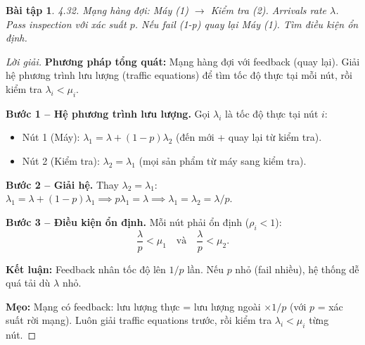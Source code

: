 \documentclass[8pt,a4paper]{article}
\newtheorem{exercise}{Bài tập}
\newenvironment{solution}{\begin{proof}[Lời giải]}{\end{proof}}
\begin{document}
\begin{exercise}
4.32. Mạng hàng đợi: Máy (1) $\to$ Kiểm tra (2). Arrivals rate $\lambda$. Pass inspection với xác suất $p$. Nếu fail (1-p) quay lại Máy (1). Tìm điều kiện ổn định.
\end{exercise}
\begin{solution}
\textbf{Phương pháp tổng quát:} Mạng hàng đợi với feedback (quay lại). Giải hệ phương trình lưu lượng (traffic equations) để tìm tốc độ thực tại mỗi nút, rồi kiểm tra $\lambda_i < \mu_i$.

\textbf{Bước 1 -- Hệ phương trình lưu lượng.} Gọi $\lambda_i$ là tốc độ thực tại nút $i$:
\begin{itemize}[nosep]
\item Nút 1 (Máy): $\lambda_1 = \lambda + (1-p)\lambda_2$ \quad (đến mới + quay lại từ kiểm tra).
\item Nút 2 (Kiểm tra): $\lambda_2 = \lambda_1$ \quad (mọi sản phẩm từ máy sang kiểm tra).
\end{itemize}

\textbf{Bước 2 -- Giải hệ.} Thay $\lambda_2 = \lambda_1$:
$\lambda_1 = \lambda + (1-p)\lambda_1 \implies p\lambda_1 = \lambda \implies \boxed{\lambda_1 = \lambda_2 = \lambda/p}$.

\textbf{Bước 3 -- Điều kiện ổn định.} Mỗi nút phải ổn định ($\rho_i < 1$):
\[
\boxed{\frac{\lambda}{p} < \mu_1 \quad \text{và} \quad \frac{\lambda}{p} < \mu_2}.
\]

\textbf{Kết luận:} Feedback nhân tốc độ lên $1/p$ lần. Nếu $p$ nhỏ (fail nhiều), hệ thống dễ quá tải dù $\lambda$ nhỏ.

\textbf{Mẹo:} Mạng có feedback: lưu lượng thực = lưu lượng ngoài $\times 1/p$ (với $p$ = xác suất rời mạng). Luôn giải traffic equations trước, rồi kiểm tra $\lambda_i < \mu_i$ từng nút.
\end{solution}

\end{document}

